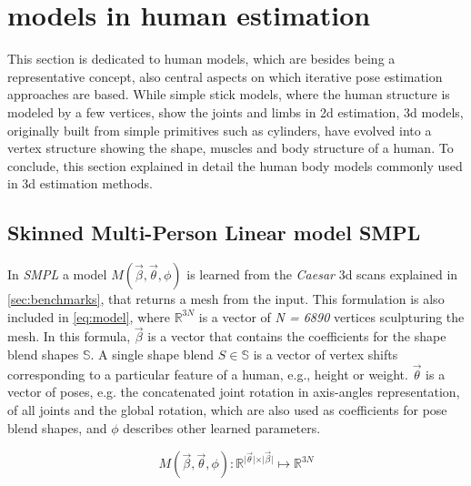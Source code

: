 \section{models in human estimation}
This section is dedicated to human models, which are besides being a representative concept, also central aspects on which iterative pose estimation approaches are based. While simple stick models, where the human structure is modeled by a few vertices, show the joints and limbs in 2d estimation, 3d models, originally built from simple primitives such as cylinders, have evolved into a vertex structure showing the shape, muscles and body structure of a human. To conclude, this section explained in detail the human body models commonly used in 3d estimation methods.

\subsection{Skinned Multi-Person Linear model SMPL}
\label{sec:SMPL}
In \emph{SMPL} \cite{smpl} a model $M(\vec{\beta},\vec{\theta},\phi)$ is learned from the \emph{Caesar} 3d scans explained in \autoref{sec:benchmarks}, that returns a mesh from the input. This formulation is also included in \autoref{eq:model}, where $\mathbb{R}^{3N}$ is a vector of \emph{N = 6890} vertices sculpturing the mesh. In this formula, $\vec{\beta}$ is a vector that contains the coefficients for the shape blend shapes $\mathbb{S}$. 
A single shape blend $S \in \mathbb{S}$ is a vector of vertex shifts corresponding to a particular feature of a human, e.g., height or weight. $\vec{\theta}$ is a vector of poses, e.g. the concatenated joint rotation in axis-angles representation, of all joints and the global rotation, which are also used as coefficients for pose blend shapes, and $\phi$ describes other learned parameters. 

\begin{equation}
\label{eq:model}
M(\vec{\beta},\vec{\theta},\phi) : \mathbb{R}^{\vert \vec{\theta} \vert \times \vert \vec{\beta} \vert} \mapsto \mathbb{R}^{3N}
\end{equation}


